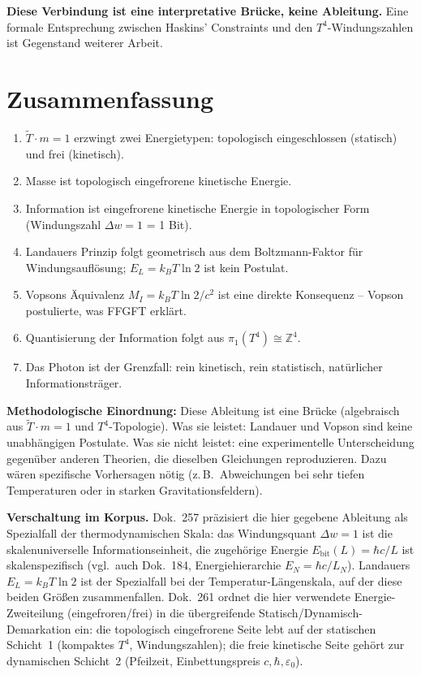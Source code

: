 \textbf{Diese Verbindung ist eine interpretative Brücke, keine Ableitung.}
Eine formale Entsprechung zwischen Haskins' Constraints und
den \(T^4\)-Windungszahlen ist Gegenstand weiterer Arbeit.

\section{Zusammenfassung}

\begin{enumerate}
  \item \(\tilde{T} \cdot m = 1\) erzwingt zwei Energietypen:
        topologisch eingeschlossen (statisch) und frei (kinetisch).
  \item Masse ist topologisch eingefrorene kinetische Energie.
  \item Information ist eingefrorene kinetische Energie
        in topologischer Form (Windungszahl \(\Delta w = 1\) = 1 Bit).
  \item Landauers Prinzip folgt geometrisch aus dem Boltzmann-Faktor
        für Windungsauflösung; \(E_L = k_BT\ln 2\) ist kein Postulat.
  \item Vopsons Äquivalenz \(M_I = k_BT\ln2/c^2\) ist eine direkte
        Konsequenz -- Vopson postulierte, was FFGFT erklärt.
  \item Quantisierung der Information folgt aus \(\pi_1(T^4)\cong\mathbb{Z}^4\).
  \item Das Photon ist der Grenzfall: rein kinetisch, rein statistisch,
        natürlicher Informationsträger.
\end{enumerate}

\bigskip
\noindent
\textbf{Methodologische Einordnung:}
Diese Ableitung ist eine Brücke (algebraisch aus \(\tilde{T}\cdot m=1\)
und \(T^4\)-Topologie).
Was sie leistet: Landauer und Vopson sind keine unabhängigen Postulate.
Was sie nicht leistet: eine experimentelle Unterscheidung gegenüber
anderen Theorien, die dieselben Gleichungen reproduzieren.
Dazu wären spezifische Vorhersagen nötig (z.\,B.\ Abweichungen bei
sehr tiefen Temperaturen oder in starken Gravitationsfeldern).

\bigskip
\noindent
\textbf{Verschaltung im Korpus.}
Dok.~257 präzisiert die hier gegebene Ableitung als Spezialfall
der thermodynamischen Skala: das Windungsquant \(\Delta w = 1\) ist
die skalenuniverselle Informationseinheit, die zugehörige Energie
\(E_\text{bit}(L) = \hbar c/L\) ist skalenspezifisch
(vgl.\ auch Dok.~184, Energiehierarchie \(E_N = \hbar c/L_N\)).
Landauers \(E_L = k_B T \ln 2\) ist der Spezialfall bei der
Temperatur-Längenskala, auf der diese beiden Größen zusammenfallen.
Dok.~261 ordnet die hier verwendete Energie-Zweiteilung
(eingefroren/frei) in die übergreifende Statisch/Dynamisch-Demarkation
ein: die topologisch eingefrorene Seite lebt auf der statischen
Schicht~1 (kompaktes \(T^4\), Windungszahlen); die freie kinetische
Seite gehört zur dynamischen Schicht~2 (Pfeilzeit, Einbettungspreis
\(c,\hbar,\varepsilon_0\)).

